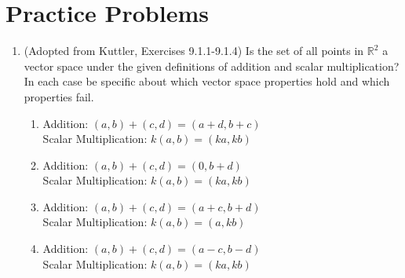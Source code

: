 \documentclass{ximera}
\begin{document}
\section*{Practice Problems}
\begin{enumerate}

 
\item (Adopted from Kuttler, Exercises 9.1.1-9.1.4) Is the set of all points in $\mathbb{R}^2$ a vector space under the given definitions of addition and scalar multiplication?    In each case be specific about which vector space properties hold and which properties fail.
  \begin{enumerate}
  \item Addition: $(a, b)+(c, d)=(a+d, b+c)$\\ Scalar Multiplication: $k(a, b)=(ka, kb)$
  \item 
  Addition: $(a, b)+(c, d)=(0, b+d)$\\ Scalar Multiplication: $k(a, b)=(ka, kb)$
  \item 
  Addition: $(a, b)+(c, d)=(a+c, b+d)$\\ Scalar Multiplication: $k(a, b)=(a, kb)$
  \item 
  Addition: $(a, b)+(c, d)=(a-c, b-d)$\\ Scalar Multiplication: $k(a, b)=(ka, kb)$
  \end{enumerate}
   

\end{enumerate}
\end{document}
